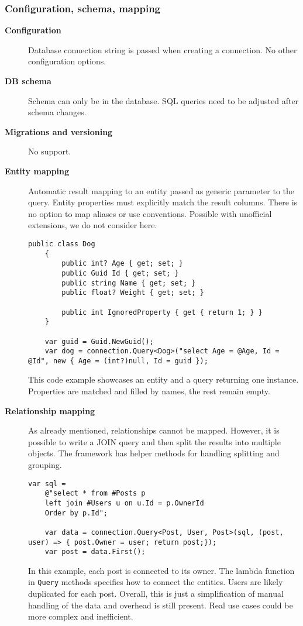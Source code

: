 \subsubsection*{Configuration, schema, mapping}
\begin{description}
    \item[\textbf{Configuration}] Database connection string is passed when creating a connection. No other configuration options.
    \item[\textbf{DB schema}] Schema can only be in the database. SQL queries need to be adjusted after schema changes.
    \item[\textbf{Migrations and versioning}] No support.
    \item[\textbf{Entity mapping}] Automatic result mapping to an entity passed as generic parameter to the query. Entity properties must explicitly match the result columns. There is no option to map aliases or use conventions. Possible with unofficial extensions, we do not consider here.
    \begin{lstlisting}[language=CSharp]
    public class Dog
    {
        public int? Age { get; set; }
        public Guid Id { get; set; }
        public string Name { get; set; }
        public float? Weight { get; set; }
    
        public int IgnoredProperty { get { return 1; } }
    }
    
    var guid = Guid.NewGuid();
    var dog = connection.Query<Dog>("select Age = @Age, Id = @Id", new { Age = (int?)null, Id = guid });
    \end{lstlisting}
    This code example\cite{DapperRepo} showcases an entity and a query returning one instance. Properties are matched and filled by names, the rest remain empty. 
    \item[\textbf{Relationship mapping}] As already mentioned, relationships cannot be mapped. However, it is possible to write a JOIN query and then split the results into multiple objects. The framework has helper methods for handling splitting and grouping.
    \begin{lstlisting}[language=CSharp]
    var sql =
    @"select * from #Posts p
    left join #Users u on u.Id = p.OwnerId
    Order by p.Id";
    
    var data = connection.Query<Post, User, Post>(sql, (post, user) => { post.Owner = user; return post;});
    var post = data.First();
    \end{lstlisting}
    In this example, each post is connected to its owner. The lambda function in \texttt{Query} methods specifies how to connect the entities. Users are likely duplicated for each post. Overall, this is just a simplification of manual handling of the data and overhead is still present. Real use cases could be more complex and inefficient.
    

\end{description}
